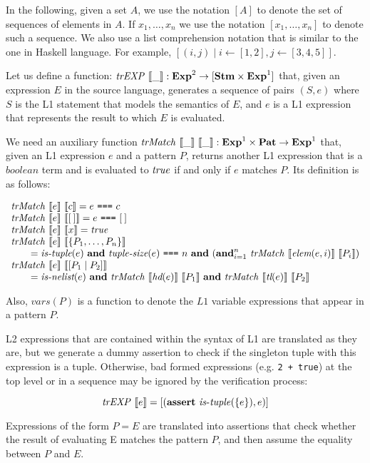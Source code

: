 In the following, given a set $A$, we use the notation $[A]$ to denote the set of 
sequences of elements in $A$. If $x_1, \ldots, x_n$ we use the notation 
$[x_1, \ldots, x_n]$ to denote such a sequence. We also use a list comprehension 
notation that is similar to the one in Haskell language. For example, 
$[(i, j) \mid i \leftarrow [1, 2], j \leftarrow [3, 4, 5]]$.

Let us define a function: $\mathit{trEXP}~\llbracket\_\rrbracket : \mathbf{Exp}^{2} \rightarrow [\mathbf{Stm} \times \mathbf{Exp}^{1}]$ 
that, given an expression $E$ in the source language, generates a sequence of pairs 
$(S, e)$ where $S$ is the L1 statement that models the semantics of $E$, and $e$ is a 
L1 expression that represents the result to which $E$ is evaluated.

We need an auxiliary function 
$\mathit{trMatch}~\llbracket\_\rrbracket~\llbracket\_\rrbracket : \mathbf{Exp}^{1} \times \mathbf{Pat} \rightarrow \mathbf{Exp}^{1}$ that, given an L1 
expression $e$ and a pattern $P$, returns another L1 expression that is a 
$\mathit{boolean}$ term and is evaluated to $\mathit{true}$ if and only if $e$ 
matches $P$. Its definition is as follows:

\[
\begin{array}{l}
\mathit{trMatch}~\llbracket e\rrbracket~\llbracket c\rrbracket = e~\texttt{===}~{c}\\
\mathit{trMatch}~\llbracket e\rrbracket~\llbracket[\:]\rrbracket = e~\texttt{===}~{[\:]} \\
\mathit{trMatch}~\llbracket e\rrbracket~\llbracket x\rrbracket = \mathit{true}\\
\mathit{trMatch}~\llbracket e\rrbracket~\llbracket\{P_1,\ldots,P_n\}\rrbracket\\
\qquad = \textit{is-tuple}(e)~\mathbf{and}~\textit{tuple-size}(e)~\texttt{===}~n~\mathbf{and}~(\mathbf{and}_{i=1}^n~\mathit{trMatch}~\llbracket\textit{elem}(e, i)\rrbracket~\llbracket P_i\rrbracket)\\
\mathit{trMatch}~\llbracket e\rrbracket~\llbracket[P_1\mid P_2]\rrbracket\\
\qquad = \textit{is-nelist}(e)~\mathbf{and}~\mathit{trMatch}~\llbracket\textit{hd}(e)\rrbracket~\llbracket P_1\rrbracket~\mathbf{and}~\mathit{trMatch}~\llbracket\textit{tl}(e)\rrbracket~\llbracket P_2\rrbracket
\end{array}
\]

Also, $\mathit{vars}(P)$ is a function to denote the $L1$ variable expressions that 
appear in a pattern $P$.

L2 expressions that are contained within the syntax of L1 are translated as they
are, but we generate a dummy assertion to check if the singleton tuple with this
expression is a tuple. Otherwise, bad formed expressions (e.g. \verb|2 + true|)
at the top level or in a sequence may be ignored by the verification process:

\[
\mathit{trEXP}~\llbracket e\rrbracket = [(\textbf{assert}~\mathit{is\mbox{-}tuple}(\{e\}), e)]
\]

Expressions of the form $P = E$ are translated into assertions that check whether the
result of evaluating E matches the pattern $P$, and then assume the equality between 
$P$ and $E$.

